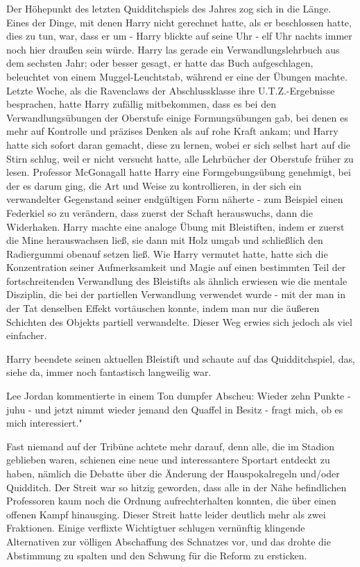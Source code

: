 Der Höhepunkt des letzten Quidditchspiels des Jahres zog sich in die Länge.
Eines der Dinge, mit denen Harry nicht gerechnet hatte, als er beschlossen
hatte, dies zu tun, war, dass er um - Harry blickte auf seine Uhr - elf Uhr
nachts immer noch hier draußen sein würde. Harry las gerade ein
Verwandlungslehrbuch aus dem sechsten Jahr; oder besser gesagt, er hatte das
Buch aufgeschlagen, beleuchtet von einem Muggel-Leuchtstab, während er eine der
Übungen machte. Letzte Woche, als die Ravenclaws der Abschlussklasse ihre
U.T.Z.-Ergebnisse besprachen, hatte Harry zufällig mitbekommen, dass es bei den
Verwandlungsübungen der Oberstufe einige \glqq Formungsübungen\grqq{} gab, bei
denen es mehr auf Kontrolle und präzises Denken als auf rohe Kraft ankam; und
Harry hatte sich sofort daran gemacht, diese zu lernen, wobei er sich selbst
hart auf die Stirn schlug, weil er nicht versucht hatte, alle Lehrbücher der
Oberstufe früher zu lesen. Professor McGonagall hatte Harry eine
Formgebungsübung genehmigt, bei der es darum ging, die Art und Weise zu
kontrollieren, in der sich ein verwandelter Gegenstand seiner endgültigen Form
näherte - zum Beispiel einen Federkiel so zu verändern, dass zuerst der Schaft
herauswuchs, dann die Widerhaken. Harry machte eine analoge Übung mit
Bleistiften, indem er zuerst die Mine herauswachsen ließ, sie dann mit Holz
umgab und schließlich den Radiergummi obenauf setzen ließ. Wie Harry vermutet
hatte, hatte sich die Konzentration seiner Aufmerksamkeit und Magie auf einen
bestimmten Teil der fortschreitenden Verwandlung des Bleistifts als ähnlich
erwiesen wie die mentale Disziplin, die bei der partiellen Verwandlung verwendet
wurde - mit der man in der Tat denselben Effekt vortäuschen konnte, indem man
nur die äußeren Schichten des Objekts partiell verwandelte. Dieser Weg erwies
sich jedoch als viel einfacher.

Harry beendete seinen aktuellen Bleistift und schaute auf das Quidditchspiel,
das, siehe da, immer noch fantastisch langweilig war.

Lee Jordan kommentierte in einem Ton dumpfer Abscheu: \glqq Wieder zehn Punkte -
juhu - und jetzt nimmt wieder jemand den Quaffel in Besitz - fragt mich, ob es
mich interessiert."

Fast niemand auf der Tribüne achtete mehr darauf, denn alle, die im Stadion
geblieben waren, schienen eine neue und interessantere Sportart entdeckt zu
haben, nämlich die Debatte über die Änderung der Hauspokalregeln und/oder
Quidditch. Der Streit war so hitzig geworden, dass alle in der Nähe befindlichen
Professoren kaum noch die Ordnung aufrechterhalten konnten, die über einen
offenen Kampf hinausging. Dieser Streit hatte leider deutlich mehr als zwei
Fraktionen. Einige verflixte Wichtigtuer schlugen vernünftig klingende
Alternativen zur völligen Abschaffung des Schnatzes vor, und das drohte die
Abstimmung zu spalten und den Schwung für die Reform zu ersticken.

